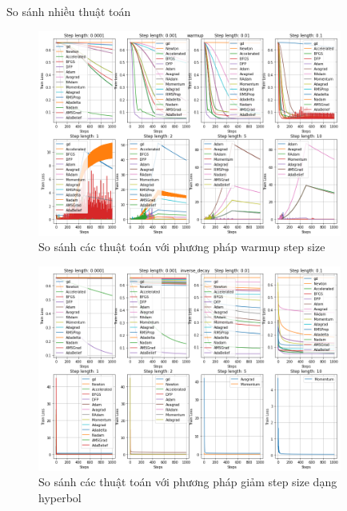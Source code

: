 \documentclass[10pt]{beamer}
\theoremstyle{remark}
\theoremstyle{definition}
\begin{document}
\begin{frame}[allowframebreaks]{So sánh nhiều thuật toán}
	\begin{figure}
		\centering
		\includegraphics[width=10cm]{Thanh/warmup-lr-step-op_step.png}
		\caption{So sánh các thuật toán với phương pháp warmup step size}
	\end{figure}

	\begin{figure}
		\centering
		\includegraphics[width=10cm]{Thanh/inverse-lr-step-op_step.png}
		\caption{So sánh các thuật toán với phương pháp giảm step size dạng hyperbol}
	\end{figure}
\end{frame}
\end{document}
